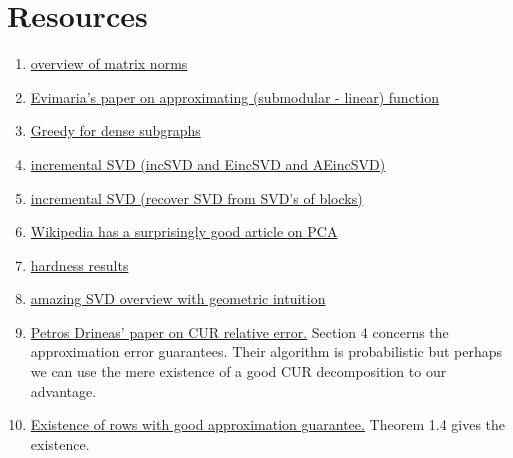 \documentclass{article}
\begin{document}
\section{Resources}
\begin{enumerate}
    \item \href{https://www.cis.upenn.edu/~cis515/cis515-11-sl4.pdf}{overview of matrix norms}
    \item \href{https://arxiv.org/pdf/2002.07782.pdf}{Evimaria's paper on approximating (submodular - linear) function}
    \item \href{https://users.ics.aalto.fi/gionis/greedy-dense.pdf}{Greedy for dense subgraphs}
    \item \href{https://ieeexplore.ieee.org/stamp/stamp.jsp?tp=&arnumber=8548605}{incremental SVD (incSVD and EincSVD and AEincSVD)}
    \item \href{https://arxiv.org/pdf/1601.07010.pdf}{incremental SVD (recover SVD from SVD's of blocks)}
    \item \href{https://en.wikipedia.org/wiki/Principal_component_analysis#Iterative_computation}{Wikipedia has a surprisingly good article on PCA}
    \item \href{https://www.semanticscholar.org/paper/The-intractability-of-computing-the-minimum-of-a-Vardy/2e0b89803e126a41e872f1d68eeb3e8eb71698c5}{hardness results}
    \item \href{https://www.cs.cmu.edu/~venkatg/teaching/CStheory-infoage/book-chapter-4.pdf}{amazing SVD overview with geometric intuition}
    \item \href{https://www.cs.purdue.edu/homes/pdrineas/documents/publications/Drineas_SIMAX_08b.pdf}{Petros Drineas' paper on CUR relative error.} Section 4 concerns the approximation error guarantees. Their algorithm is probabilistic but perhaps we can use the mere existence of a good CUR decomposition to our advantage.
    \item \href{https://www.theoryofcomputing.org/articles/v002a012/v002a012.pdf}{Existence of rows with good approximation guarantee.} Theorem 1.4 gives the existence.
\end{enumerate}
\end{document}
